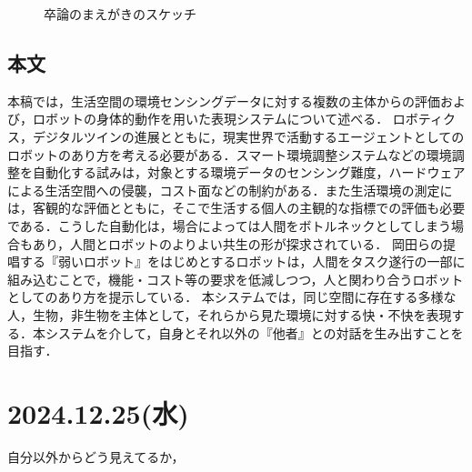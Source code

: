 \documentclass[fleqn,twocolumn]{mynote}
\begin{document}
  \fboxsep=0pt            %
  \fboxrule=1pt            %
  \begin{figure}[h]
    \centering
    \caption{卒論のまえがきのスケッチ}
    \label{fig:}
  \end{figure}

  \subsection*{本文}
  本稿では，生活空間の環境センシングデータに対する複数の主体からの評価および，ロボットの身体的動作を用いた表現システムについて述べる．
  ロボティクス，デジタルツインの進展とともに，現実世界で活動するエージェントとしてのロボットのあり方を考える必要がある．スマート環境調整システムなどの環境調整を自動化する試みは，対象とする環境データのセンシング難度，ハードウェアによる生活空間への侵襲，コスト面などの制約がある．また生活環境の測定には，客観的な評価とともに，そこで生活する個人の主観的な指標での評価も必要である．こうした自動化は，場合によっては人間をボトルネックとしてしまう場合もあり，人間とロボットのよりよい共生の形が探求されている．
  岡田らの提唱する『弱いロボット』をはじめとするロボットは，人間をタスク遂行の一部に組み込むことで，機能・コスト等の要求を低減しつつ，人と関わり合うロボットとしてのあり方を提示している．
  本システムでは，同じ空間に存在する多様な人，生物，非生物を主体として，それらから見た環境に対する快・不快を表現する．本システムを介して，自身とそれ以外の『他者』との対話を生み出すことを目指す．
  \section*{2024.12.25(水)}

  自分以外からどう見えてるか，
\end{document}
